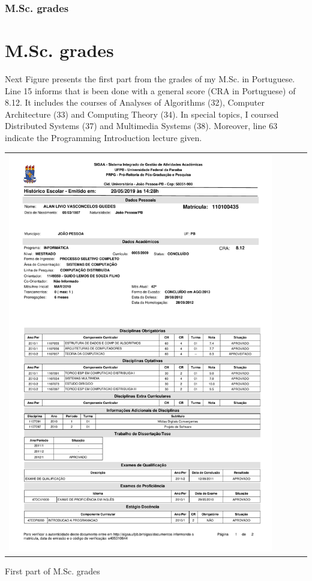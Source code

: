 \documentclass[10pt,a4paper,sans,colorlinks]{moderncv}
\begin{document}
\section{M.Sc. grades}\part{M.Sc. grades}
Next Figure presents the first part from the grades of my M.Sc. in Portuguese.
Line 15 informs that is been done with a general score (CRA in Portuguese) of 8.12.
It includes the courses of Analyses of Algorithms (32), Computer Architecture (33) and Computing Theory (34).
In special topics, I coursed Distributed Systems (37) and Multimedia Systems (38).
Moreover, line 63 indicate the Programming Introduction lecture given.
\vspace{1em}
\begin{Figure}
  \begin{tabularx}{\textwidth}{X p{1cm}}
    \includegraphics[align=t,width=0.92\textwidth, keepaspectratio, trim=0cm 0cm 0cm 2cm]{certificates/msc-grades.pdf}
  \end{tabularx}
  \caption{First part of M.Sc. grades}
\end{Figure}
\end{document}
